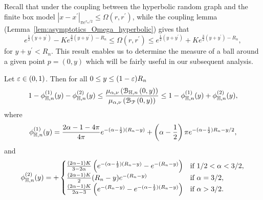 Recall that under the coupling between the hyperbolic random graph and the finite box model $|x-x^\prime|_{\pi e^{r_n/2}} \le \Omega(r,r^\prime)$, while the coupling lemma (Lemma~\ref{lem:asymptotics_Omega_hyperbolic}) gives that  
\[
	e^{\frac{1}{2}(y+y^\prime)} - K e^{\frac{3}{2}(y+y^\prime) - R_n} \leq \Omega(r, r^\prime) 
		\leq  e^{\frac{1}{2}(y+y^\prime)} + K e^{\frac{3}{2}(y+y^\prime) - R_n},
\]
for $y + y^\prime < R_n$. This result enables us to determine the measure of a ball around a given point $p=(0,y)$ which will be fairly useful in our subsequent analysis. 

\begin{lemma}\label{lem:average_degree_hyperbolic}
Let $\varepsilon \in (0, 1)$. Then for all $0 \le y \le (1 - \varepsilon)R_n$
\[
	 1 - \phi_{\mathbb{H},n}^{(1)}(y) - \phi_{\mathbb{H},n}^{(2)}(y) \le \frac{\mu_{\alpha,\nu}\left({\mathcal B}_{\mathbb{H},n}\left(0,y\right)\right)}{\mu_{\alpha,\nu}\left({\mathcal B}_{{\mathcal P}}\left(0,y\right)\right)} 
	 \le 1 - \phi_{\mathbb{H},n}^{(1)}(y) + \phi_{\mathbb{H},n}^{(2)}(y),
\]
where
\[
	\phi_{\mathbb{H},n}^{(1)}(y) = \frac{2\alpha - 1 - 4\pi}{4\pi} e^{-(\alpha - \frac{1}{2})(R_n - y)} 
		+ \left(\alpha - \frac{1}{2}\right)\pi e^{-(\alpha - \frac{1}{2})R_n - y/2},
\]
and
\[
	\phi_{\mathbb{H},n}^{(2)}(y) = 
	+ \begin{cases}
			\frac{(2\alpha - 1)K}{3 - 2\alpha}\left(e^{-(\alpha - \frac{1}{2})(R_n - y)} - e^{-(R_n - y)}\right)
			&\mbox{if } 1/2 < \alpha < 3/2,\\
			\frac{(2\alpha -1)K}{2} (R_n - y)e^{-(R_n - y)} &\mbox{if } \alpha = 3/2,\\
			\frac{(2\alpha - 1)K}{2\alpha - 3} \left(e^{-(R_n - y)} - e^{-(\alpha - \frac{1}{2})(R_n - y)}\right)
			&\mbox{if } \alpha > 3/2.
		\end{cases}
\]
\end{lemma}

